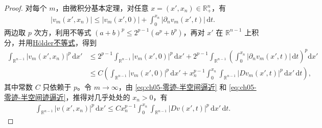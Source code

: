 \documentclass[../../main.tex]{subfiles}
\begin{document}
\begin{proof}
对每个 $m$，由微积分基本定理，对任意 $x=(x',x_{n})\in\mathbb{R}^{n}_{+}$，有
\begin{align*}
|v_{m}(x',x_{n})|\leqslant |v_{m}(x',0)|+\int_{0}^{x_{n}}|\partial_{n}v_{m}(x',t)|\,\mathrm{d}t.
\end{align*}
两边取 $p$ 次方，利用不等式 $(a+b)^{p}\leqslant 2^{p-1}(a^{p}+b^{p})$，再对 $x'$ 在 $\mathbb{R}^{n-1}$ 上积分，并用\hyperref[Real Analysis-theorem:实变函数--Hölder不等式]{Hölder不等式}，得到
\begin{align*}
\int_{\mathbb{R}^{n-1}}|v_{m}(x',x_{n})|^{p}\,\mathrm{d}x'
&\leqslant 2^{p-1}\int_{\mathbb{R}^{n-1}}|v_{m}(x',0)|^{p}\,\mathrm{d}x' +2^{p-1}\int_{\mathbb{R}^{n-1}}\left(\int_{0}^{x_{n}}|\partial_{n}v_{m}(x',t)|\,\mathrm{d}t\right)^{p}\mathrm{d}x'\\
&\leqslant C\left(\int_{\mathbb{R}^{n-1}}|v_{m}(x',0)|^{p}\,\mathrm{d}x'
+x_{n}^{p-1}\int_{0}^{x_{n}}\int_{\mathbb{R}^{n-1}}|Dv_{m}(x',t)|^{p}\,\mathrm{d}x'\,\mathrm{d}t\right),
\end{align*}
其中常数 $C$ 只依赖于 $p$。令 $m\to\infty$，由 \eqref{eq:ch05-零迹-半空间逼近} 和 \eqref{eq:ch05-零迹-半空间迹逼近}，推得对几乎处处的 $x_{n}>0$，有
\begin{align}\label{eq:ch05-零迹-半空间估计}
\int_{\mathbb{R}^{n-1}}|v(x',x_{n})|^{p}\,\mathrm{d}x'
\leqslant Cx_{n}^{p-1}\int_{0}^{x_{n}}\int_{\mathbb{R}^{n-1}}|Dv(x',t)|^{p}\,\mathrm{d}x'\,\mathrm{d}t.
\end{align}


\end{proof}
\end{document}
